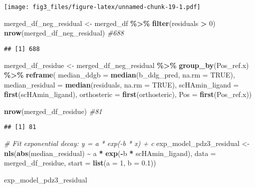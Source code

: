 \documentclass[
]{article}
\newenvironment{Shaded}{\begin{snugshade}}{\end{snugshade}}
\newcommand{\AttributeTok}[1]{\textcolor[rgb]{0.13,0.29,0.53}{#1}}
\newcommand{\CommentTok}[1]{\textcolor[rgb]{0.56,0.35,0.01}{\textit{#1}}}
\newcommand{\ConstantTok}[1]{\textcolor[rgb]{0.56,0.35,0.01}{#1}}
\newcommand{\DecValTok}[1]{\textcolor[rgb]{0.00,0.00,0.81}{#1}}
\newcommand{\FloatTok}[1]{\textcolor[rgb]{0.00,0.00,0.81}{#1}}
\newcommand{\FunctionTok}[1]{\textcolor[rgb]{0.13,0.29,0.53}{\textbf{#1}}}
\newcommand{\NormalTok}[1]{#1}
\newcommand{\OtherTok}[1]{\textcolor[rgb]{0.56,0.35,0.01}{#1}}
\newcommand{\SpecialCharTok}[1]{\textcolor[rgb]{0.81,0.36,0.00}{\textbf{#1}}}
\begin{document}
\texttt{[image: fig3\_files/figure-latex/unnamed-chunk-19-1.pdf]}

\begin{Shaded}
\begin{Highlighting}[]
\NormalTok{merged\_df\_neg\_residual }\OtherTok{\textless{}{-}}\NormalTok{ merged\_df }\SpecialCharTok{\%\textgreater{}\%} \FunctionTok{filter}\NormalTok{(residuals }\SpecialCharTok{\textgreater{}} \DecValTok{0}\NormalTok{)}
\FunctionTok{nrow}\NormalTok{(merged\_df\_neg\_residual) }\CommentTok{\#688}
\end{Highlighting}
\end{Shaded}

\begin{verbatim}
## [1] 688
\end{verbatim}

\begin{Shaded}
\begin{Highlighting}[]
\NormalTok{merged\_df\_residue }\OtherTok{\textless{}{-}}\NormalTok{ merged\_df\_neg\_residual }\SpecialCharTok{\%\textgreater{}\%}
  \FunctionTok{group\_by}\NormalTok{(Pos\_ref.x) }\SpecialCharTok{\%\textgreater{}\%}
  \FunctionTok{reframe}\NormalTok{(}
    \AttributeTok{median\_ddgb =} \FunctionTok{median}\NormalTok{(b\_ddg\_pred, }\AttributeTok{na.rm =} \ConstantTok{TRUE}\NormalTok{),}
    \AttributeTok{median\_residual =} \FunctionTok{median}\NormalTok{(residuals, }\AttributeTok{na.rm =} \ConstantTok{TRUE}\NormalTok{),}
    \AttributeTok{scHAmin\_ligand =} \FunctionTok{first}\NormalTok{(scHAmin\_ligand),}
    \AttributeTok{orthosteric =} \FunctionTok{first}\NormalTok{(orthosteric),}
    \AttributeTok{Pos =} \FunctionTok{first}\NormalTok{(Pos\_ref.x))}

\FunctionTok{nrow}\NormalTok{(merged\_df\_residue) }\CommentTok{\#81}
\end{Highlighting}
\end{Shaded}

\begin{verbatim}
## [1] 81
\end{verbatim}

\begin{Shaded}
\begin{Highlighting}[]
\CommentTok{\# Fit exponential decay: y = a * exp({-}b * x) + c}
\NormalTok{exp\_model\_pdz3\_residual }\OtherTok{\textless{}{-}} \FunctionTok{nls}\NormalTok{(}\FunctionTok{abs}\NormalTok{(median\_residual) }\SpecialCharTok{\textasciitilde{}}\NormalTok{ a }\SpecialCharTok{*} \FunctionTok{exp}\NormalTok{(}\SpecialCharTok{{-}}\NormalTok{b }\SpecialCharTok{*}\NormalTok{ scHAmin\_ligand),}
                 \AttributeTok{data =}\NormalTok{ merged\_df\_residue,}
                 \AttributeTok{start =} \FunctionTok{list}\NormalTok{(}\AttributeTok{a =} \DecValTok{1}\NormalTok{, }\AttributeTok{b =} \FloatTok{0.1}\NormalTok{))}

\NormalTok{exp\_model\_pdz3\_residual }
\end{Highlighting}
\end{Shaded}
\end{document}
